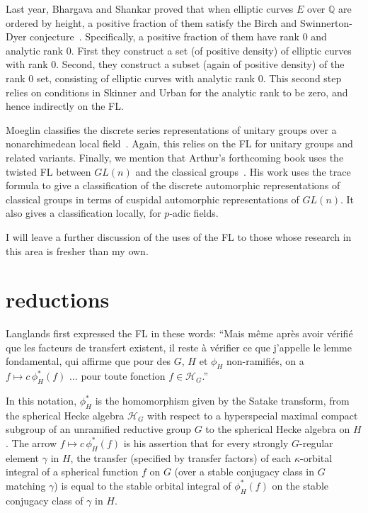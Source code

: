\documentclass[brochure,english,12pt]{bourbaki}
\theoremstyle{plain}
\newcommand{\ring}[1]{\mathbb{#1}}
\begin{document}
Last year, Bhargava and Shankar proved that when elliptic curves $E$
over $\ring{Q}$ are ordered by height, a positive fraction of them
satisfy the Birch and Swinnerton-Dyer conjecture~\cite{BS:2010}.
Specifically, a positive fraction of them have rank $0$ and analytic
rank $0$.  First they construct a set (of positive density) of
elliptic curves with rank $0$.  Second, they construct a subset (again
of positive density) of the rank $0$ set, consisting of elliptic
curves with analytic rank $0$.  This second step relies on conditions
in Skinner and Urban for the analytic rank to be zero, and hence
indirectly on the FL.


Moeglin classifies the discrete series representations of unitary
groups over a nonarchimedean local field~\cite{Moeglin:2007}.  Again,
this relies on the FL for unitary groups and related
variants. Finally, we mention that Arthur's forthcoming book uses the
twisted FL between $GL(n)$ and the classical
groups~\cite{Arthur:2011}.  His work uses the trace formula to give a
classification of the discrete automorphic representations of
classical groups in terms of cuspidal automorphic representations of
$GL(n)$.  It also gives a classification locally, for $p$-adic fields.

I will leave a further discussion of the uses of the FL to those whose research
in this area is fresher than my own.

%




\section{reductions}\label{sec:reduce}

Langlands first expressed the FL in these words:
``Mais m\^eme apr\`es avoir
v\'erifi\'e que les facteurs de
transfert existent, il reste \`a v\'erifier ce que j'appelle le
lemme fondamental, qui affirme que pour des $G$, $H$ et $\phi_H$
non-ramifi\'es, on a $f\mapsto c\, \phi_H^*(f)$ $\ldots$ 
pour toute fonction $f\in {\mathcal H}_G$.''
\cite[p.49]{Langlands:debuts}

 In this notation, $\phi_H^*$ is the homomorphism given by the
 Satake transform, from the spherical Hecke algebra ${\mathcal H}_G$
  with respect to a hyperspecial maximal compact subgroup
of an unramified reductive group $G$ to the spherical Hecke algebra
 on $H$ .  The
 arrow $f\mapsto c\,\phi_H^*(f)$ is his assertion that for every
 strongly $G$-regular element $\gamma$ in $H$, the transfer (specified by
 transfer factors) of each $\kappa$-orbital integral of a spherical
 function $f$ on $G$ (over a stable conjugacy class in $G$ matching
 $\gamma$) is equal to the stable orbital integral of $\phi_H^*(f)$ on
 the stable conjugacy class of $\gamma$ in $H$.
\end{document}
